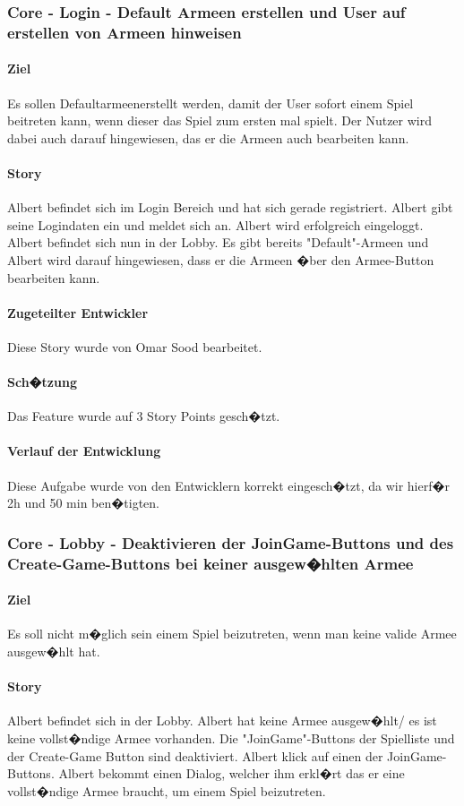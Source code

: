\documentclass[12pt, titlepage]{scrartcl}
\begin{document}
			\subsubsection{Core - Login - Default Armeen erstellen und User auf erstellen von Armeen hinweisen}
			\paragraph{Ziel} Es sollen \glqq Defaultarmeen\grqq erstellt werden, damit der User sofort einem Spiel beitreten kann, wenn dieser das Spiel zum ersten mal spielt. Der Nutzer wird dabei auch darauf hingewiesen, das er die Armeen auch bearbeiten kann.
			\paragraph{Story} Albert befindet sich im Login Bereich und hat sich gerade registriert. Albert gibt seine Logindaten ein und meldet sich an. Albert wird erfolgreich eingeloggt. Albert befindet sich nun in der Lobby. Es gibt bereits  "Default"-Armeen und Albert wird darauf hingewiesen, dass er die Armeen �ber den Armee-Button bearbeiten kann.
			\paragraph{Zugeteilter Entwickler} Diese Story wurde von Omar Sood bearbeitet.
			\paragraph{Sch�tzung}
			Das Feature wurde auf 3 Story Points gesch�tzt.
			\paragraph{Verlauf der Entwicklung} 
			Diese Aufgabe wurde von den Entwicklern korrekt eingesch�tzt, da wir hierf�r 2h und 50 min ben�tigten.
			
			\subsubsection{Core - Lobby - Deaktivieren der JoinGame-Buttons und des Create-Game-Buttons bei keiner ausgew�hlten Armee}
			\paragraph{Ziel} Es soll nicht m�glich sein einem Spiel beizutreten, wenn man keine valide Armee ausgew�hlt hat.
			\paragraph{Story} Albert befindet sich in der Lobby. Albert hat keine Armee ausgew�hlt/ es ist keine vollst�ndige Armee vorhanden. Die "JoinGame"-Buttons der Spielliste und der Create-Game Button sind deaktiviert. Albert klick auf einen der JoinGame-Buttons. Albert bekommt einen Dialog, welcher ihm erkl�rt das er eine vollst�ndige Armee braucht, um einem Spiel beizutreten.
\end{document}
